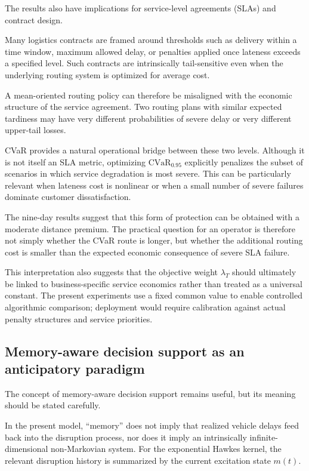 \documentclass[preprint,12pt]{elsarticle}
\newcommand{\CVaR}{\mathrm{CVaR}}
\newcommand{\1}{\mathbf{1}}
\begin{document}
The results also have implications for service-level agreements (SLAs) and
contract design.

Many logistics contracts are framed around thresholds such as delivery within a
time window, maximum allowed delay, or penalties applied once lateness exceeds a
specified level. Such contracts are intrinsically tail-sensitive even when the
underlying routing system is optimized for average cost.

A mean-oriented routing policy can therefore be misaligned with the economic
structure of the service agreement. Two routing plans with similar expected
tardiness may have very different probabilities of severe delay or very
different upper-tail losses.

CVaR provides a natural operational bridge between these two levels.
Although it is not itself an SLA metric, optimizing
$\CVaR_{0.95}$ explicitly penalizes the subset of scenarios in which service
degradation is most severe. This can be particularly relevant when lateness
cost is nonlinear or when a small number of severe failures dominate customer
dissatisfaction.

The nine-day results suggest that this form of protection can be obtained with a
moderate distance premium. The practical question for an operator is therefore
not simply whether the CVaR route is longer, but whether the additional routing
cost is smaller than the expected economic consequence of severe SLA failure.

This interpretation also suggests that the objective weight $\lambda_T$ should
ultimately be linked to business-specific service economics rather than treated
as a universal constant. The present experiments use a fixed common value to
enable controlled algorithmic comparison; deployment would require calibration
against actual penalty structures and service priorities.

\subsection{Memory-aware decision support as an anticipatory paradigm}
\label{subsec:anticipatory}

The concept of memory-aware decision support remains useful, but its meaning
should be stated carefully.

In the present model, ``memory'' does not imply that realized vehicle delays
feed back into the disruption process, nor does it imply an intrinsically
infinite-dimensional non-Markovian system. For the exponential Hawkes kernel,
the relevant disruption history is summarized by the current excitation state
$m(t)$.
\end{document}
